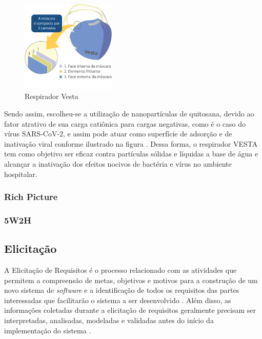 \begin{figure}[H]
 \begin{center}
  \includegraphics[width=0.4\textwidth]{figuras/Vesta.png}
   \caption{{Respirador Vesta }}\label{fig:vesta}
  \end{center}
\end{figure}

Sendo assim, escolheu-se a utilização de nanopartículas de quitosana,  devido ao fator atrativo de sua carga catiônica para cargas negativas, como é o caso do vírus SARS-CoV-2, e assim pode atuar como superfície de adsorção e de inativação viral conforme ilustrado na figura  \cite{ciejka}. Dessa forma, o respirador VESTA tem como objetivo ser eficaz contra partículas sólidas e líquidas a base de água e alcançar a inativação dos efeitos nocivos de bactéria e vírus no ambiente hospitalar. 

\subsubsection{Rich Picture}

\subsubsection{5W2H}

\subsection {Elicitação}
A Elicitação de Requisitos é o processo relacionado com as atividades que permitem a compreensão de metas, objetivos e motivos para a construção de um novo sistema de \textit{software} e a identificação de todos os requisitos das partes interessadas que facilitarão o sistema a ser desenvolvido \cite{elliott2012software}. Além disso, as informações coletadas durante a elicitação de requisitos geralmente precisam ser interpretadas, analisadas, modeladas e validadas antes do início da implementação do sistema \cite{nuseibeh2000requirements}.

